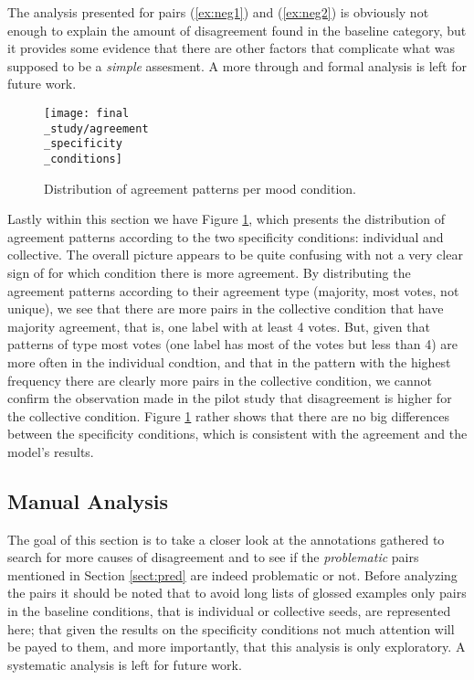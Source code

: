The analysis presented for pairs (\ref{ex:neg1}) and (\ref{ex:neg2}) is obviously not enough to explain the amount of disagreement found in the baseline category, but it provides some evidence that there are other factors that complicate what was supposed to be a \textit{simple} assesment. A more through and formal analysis is left for future work.\\

\begin{figure}
\parbox{15cm}{\texttt{[image: final\\\_study/agreement\\\_specificity\\\_conditions]}
\caption{Distribution of agreement patterns per mood condition.}\label{fig:specpat}}
\qquad
\end{figure}

Lastly within this section we have Figure \ref{fig:specpat}, which presents the distribution of agreement patterns according to the two specificity conditions: individual and collective. The overall picture appears to be quite confusing with not a very clear sign of for which condition there is more agreement. By distributing the agreement patterns according to their agreement type (majority, most votes, not unique), we see that there are more pairs in the collective condition that have majority agreement, that is, one label with at least 4 votes. But, given that patterns of type most votes (one label has most of the votes but less than 4) are more often in the individual condtion, and that in the pattern with the highest frequency there are clearly more pairs in the collective condition, we cannot confirm the observation made in the pilot study that disagreement is higher for the collective condition. Figure \ref{fig:specpat} rather shows that there are no big differences between the specificity conditions, which is consistent with the agreement and the model's results.\\

\subsection{Manual Analysis}
\label{subsect:man}

The goal of this section is to take a closer look at the annotations gathered to search for more causes of disagreement and to see if the \textit{problematic} pairs mentioned in Section \ref{sect:pred} are indeed problematic or not. Before analyzing the pairs it should be noted that to avoid long lists of glossed examples only pairs in the baseline conditions, that is individual or collective seeds, are represented here; that given the results on the specificity conditions not much attention will be payed to them, and more importantly, that this analysis is only exploratory. A systematic analysis is left for future work.\\ 


